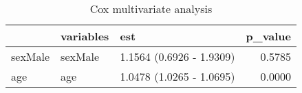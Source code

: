 \begin{table}

\caption{Cox multivariate analysis}
\centering
\begin{tabular}[t]{l|l|l|r}
\hline
  & variables & est & p\_value\\
\hline
sexMale & sexMale & 1.1564 (0.6926 - 1.9309) & 0.5785\\
\hline
age & age & 1.0478 (1.0265 - 1.0695) & 0.0000\\
\hline
\end{tabular}
\end{table}
